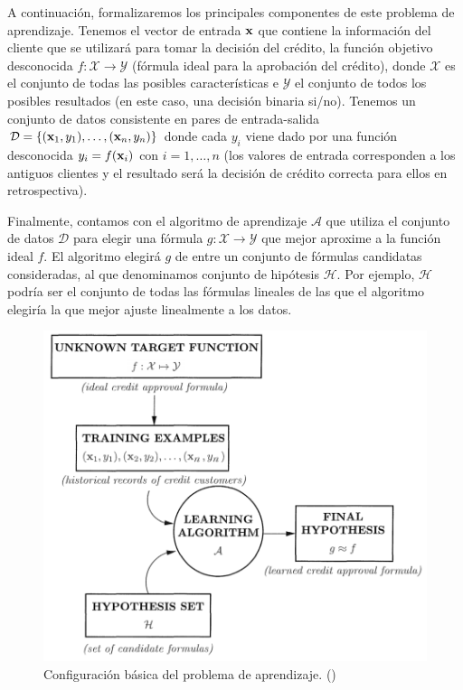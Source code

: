 \documentclass[oneside,openright,titlepage,numbers=noenddot,openany,headinclude,footinclude=true,
cleardoublepage=empty,abstractoff,BCOR=5mm,paper=a4,fontsize=12pt,main=spanish]{scrreprt}
\begin{document}
A continuación, formalizaremos los principales componentes de este problema de aprendizaje. Tenemos el vector de entrada $\textbf{x}$ que contiene la información del cliente que se utilizará para tomar la decisión del crédito, la función objetivo desconocida $f\colon \mathcal{X}\to \mathcal{Y}$ (fórmula ideal para la aprobación del crédito), donde $\mathcal{X}$ es el conjunto de todas las posibles características e $\mathcal{Y}$ el conjunto de todos los posibles resultados (en este caso, una decisión binaria si/no). Tenemos un conjunto de datos consistente en pares de entrada-salida $\mathcal{D}=\{(\textbf{x}_1,y_1),\dots,(\textbf{x}_n,y_n)\}$ donde cada  $y_i$ viene dado por una función desconocida $y_i=f(\textbf{x}_i)$ con $i=1,\dots,n$ (los valores de entrada corresponden a los antiguos clientes y el resultado será la decisión de crédito correcta para ellos en retrospectiva).

Finalmente, contamos con el algoritmo de aprendizaje $\mathcal{A}$ que utiliza el conjunto de datos $\mathcal{D}$ para elegir una fórmula $g\colon \mathcal{X}\to \mathcal{Y}$ que mejor aproxime a la función ideal $f$. El algoritmo elegirá $g$ de entre un conjunto de fórmulas candidatas consideradas, al que denominamos conjunto de hipótesis $\mathcal{H}$. Por ejemplo, $\mathcal{H}$ podría ser el conjunto de todas las fórmulas lineales de las que el algoritmo elegiría la que mejor ajuste linealmente a los datos.\\

\begin{figure}[h]
	\centering
	\includegraphics[width=12.6cm]{setup_learning.png}
	\caption{Configuración básica del problema de aprendizaje. (\cite{learning2012})}
    \label{fig:learningesq}
\end{figure}
\end{document}
